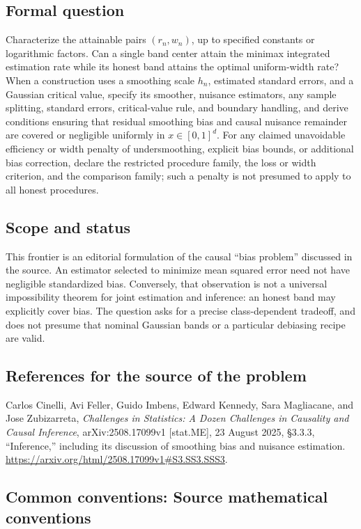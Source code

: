 \documentclass[11pt,a4paper]{article}
\begin{document}
\subsection*{Formal question}
Characterize the attainable pairs $(r_n,w_n)$, up to specified constants or logarithmic factors. Can a single band center attain the minimax integrated estimation rate while its honest band attains the optimal uniform-width rate? When a construction uses a smoothing scale $h_n$, estimated standard errors, and a Gaussian critical value, specify its smoother, nuisance estimators, any sample splitting, standard errors, critical-value rule, and boundary handling, and derive conditions ensuring that residual smoothing bias and causal nuisance remainder are covered or negligible uniformly in $x\in[0,1]^d$. For any claimed unavoidable efficiency or width penalty of undersmoothing, explicit bias bounds, or additional bias correction, declare the restricted procedure family, the loss or width criterion, and the comparison family; such a penalty is not presumed to apply to all honest procedures.
\subsection*{Scope and status}
This frontier is an editorial formulation of the causal ``bias problem'' discussed in the source. An estimator selected to minimize mean squared error need not have negligible standardized bias. Conversely, that observation is not a universal impossibility theorem for joint estimation and inference: an honest band may explicitly cover bias. The question asks for a precise class-dependent tradeoff, and does not presume that nominal Gaussian bands or a particular debiasing recipe are valid.
\subsection*{References for the source of the problem}
Carlos Cinelli, Avi Feller, Guido Imbens, Edward Kennedy, Sara Magliacane, and Jose Zubizarreta, \emph{Challenges in Statistics: A Dozen Challenges in Causality and Causal Inference}, arXiv:2508.17099v1 [stat.ME], 23 August 2025, \S3.3.3, ``Inference,'' including its discussion of smoothing bias and nuisance estimation. \url{https://arxiv.org/html/2508.17099v1#S3.SS3.SSS3}.

\subsection*{Common conventions: Source mathematical conventions}
\end{document}
